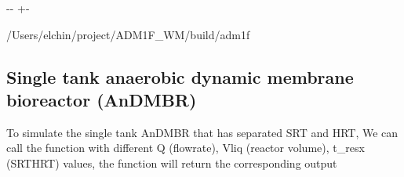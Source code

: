 \documentclass[a4paper,10pt,english]{sphinxmanual}
\newlength\nbsphinxcodecellspacing
\begin{document}
{
\begin{sphinxVerbatim}[commandchars=\\\{\}]
\llap{\color{nbsphinxin}[3]:\,\hspace{\fboxrule}\hspace{\fboxsep}}
\end{sphinxVerbatim}
}

{
\begin{sphinxVerbatim}[commandchars=\\\{\}]
\llap{\color{nbsphinxin}[4]:\,\hspace{\fboxrule}\hspace{\fboxsep}}
 
\end{sphinxVerbatim}
}

{

\kern-\sphinxverbatimsmallskipamount\kern-\baselineskip
\kern+\FrameHeightAdjust\kern-\fboxrule
\vspace{\nbsphinxcodecellspacing}

\begin{sphinxVerbatim}[commandchars=\\\{\}]
/Users/elchin/project/ADM1F\_WM/build/adm1f
\end{sphinxVerbatim}
}


\subsection{Single tank anaerobic dynamic membrane bioreactor (AnDMBR)}
\label{\detokenize{jupyter_notebook/ADM1F_SRT_2phase:Single-tank-anaerobic-dynamic-membrane-bioreactor-(AnDMBR)}}
\sphinxAtStartPar
To simulate the single tank AnDMBR that has separated SRT and HRT, We can call the function with different Q (flow\sphinxhyphen{}rate), Vliq (reactor volume), t\_resx (SRT\sphinxhyphen{}HRT) values, the function will return the corresponding output
\end{document}
